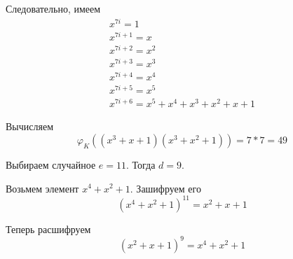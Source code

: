 \documentclass[_00_dissertation.tex]{subfiles}
\begin{document}
\begin{example}
	Следовательно, имеем
	\begin{equation*}
		\begin{array}{l}
			x^{7i} = 1\\
			x^{7i+1} = x\\
			x^{7i+2} = x^2\\
			x^{7i+3} = x^3\\
			x^{7i+4} = x^4\\
			x^{7i+5} = x^5\\
			x^{7i+6} = x^5 + x^4 + x^3 + x^2 + x + 1
		\end{array}
	\end{equation*}
	
	Вычисляем
	\begin{equation*}
		\varphi_K((x^3 + x + 1)(x^3 + x^2 + 1)) = 7 * 7 = 49
	\end{equation*}
	
	Выбираем случайное $e = 11$.
	Тогда $d=9$.
	
	Возьмем элемент $x^4 + x^2 + 1$.
	Зашифруем его
	\begin{equation*}
		(x^4 + x^2 + 1)^{11} = x^2 + x + 1
	\end{equation*}
	
	Теперь расшифруем
	\begin{equation*}
		(x^2 + x + 1)^{9} = x^4 + x^2 + 1
	\end{equation*}
\end{example}
\end{document}
